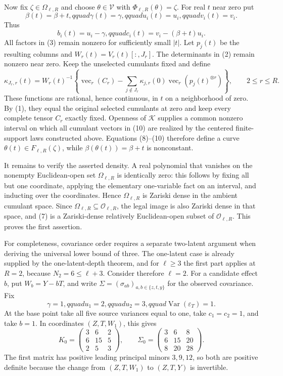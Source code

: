 Now fix \(\zeta\in\Omega_{\ell,R}\) and choose \(\theta\in\mathcal V\) with \(\Phi_{\ell,R}(\theta)=\zeta\).  For real \(t\) near zero put
\[
 \beta(t)=\beta+t,qquad
 \gamma(t)=\gamma,qquad
 u_i(t)=u_i,qquad
 v_i(t)=v_i.
 \tag{8}
\]
Thus
\[
 b_i(t)=u_i-\gamma,qquad
 c_i(t)=v_i-(\beta+t)u_i.
 \tag{9}
\]
All factors in (3) remain nonzero for sufficiently small \(|t|\).  Let \(p_j(t)\) be the resulting columns and \(W_r(t)=V_r(t)[:,J_r]\).  The determinants in (2) remain nonzero near zero.  Keep the unselected cumulants fixed and define
\[
 \kappa_{J_r,r}(t)
 =W_r(t)^{-1}\left\{\operatorname{vec}_r(C_r)
 -\sum_{j\notin J_r}\kappa_{j,r}(0)
       \operatorname{vec}_r(p_j(t)^{\otimes r})\right\},
 \qquad 2\le r\le R.
 \tag{10}
\]
These functions are rational, hence continuous, in \(t\) on a neighborhood of zero.  By (1), they equal the original selected cumulants at zero and keep every complete tensor \(C_r\) exactly fixed.  Openness of \(\mathcal K\) supplies a common nonzero interval on which all cumulant vectors in (10) are realized by the centered finite-support laws constructed above.  Equations (8)--(10) therefore define a curve \(\theta(t)\in F_{\ell,R}(\zeta)\), while \(\beta(\theta(t))=\beta+t\) is nonconstant.

It remains to verify the asserted density.  A real polynomial that vanishes on the nonempty Euclidean-open set \(\Omega_{\ell,R}\) is identically zero: this follows by fixing all but one coordinate, applying the elementary one-variable fact on an interval, and inducting over the coordinates.  Hence \(\Omega_{\ell,R}\) is Zariski dense in the ambient cumulant space.  Since \(\Omega_{\ell,R}\subseteq\mathcal O_{\ell,R}\), the legal image is also Zariski dense in that space, and (7) is a Zariski-dense relatively Euclidean-open subset of \(\mathcal O_{\ell,R}\).  This proves the first assertion.

For completeness, covariance order requires a separate two-latent argument when deriving the universal lower bound of three.  The one-latent case is already supplied by the one-latent-depth theorem, and for \(\ell\ge3\) the first part applies at \(R=2\), because \(N_2=6\le\ell+3\).  Consider therefore \(\ell=2\).  For a candidate effect \(b\), put \(W_b=Y-bT\), and write \(\Sigma=(\sigma_{ab})_{a,b\in\{z,t,y\}}\) for the observed covariance.  Fix
\[
 \gamma=1,qquad u_1=2,qquad u_2=3,qquad
 \operatorname{Var}(\varepsilon_T)=1.
\]
At the base point take all five source variances equal to one, take \(c_1=c_2=1\), and take \(b=1\).  In coordinates \((Z,T,W_1)\), this gives
\[
 K_0=
 \begin{pmatrix}
 3&6&2\\
 6&15&5\\
 2&5&3
 \end{pmatrix},
\qquad
 \Sigma_0=
 \begin{pmatrix}
 3&6&8\\
 6&15&20\\
 8&20&28
 \end{pmatrix}.
 \tag{11}
\]
The first matrix has positive leading principal minors \(3,9,12\), so both are positive definite because the change from \((Z,T,W_1)\) to \((Z,T,Y)\) is invertible.

